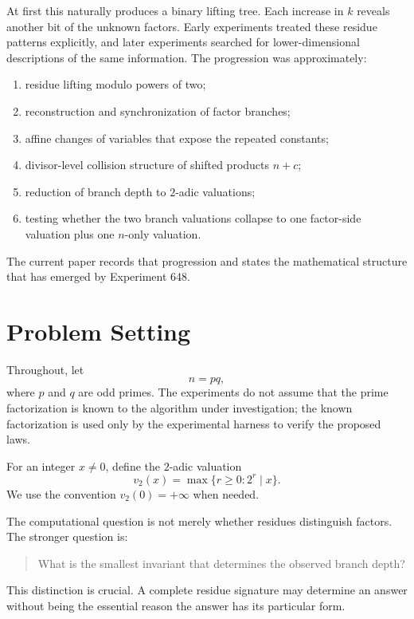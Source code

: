 \documentclass[11pt,a4paper]{article}
\newcommand{\vTwo}{v_2}
\begin{document}
At first this naturally produces a binary lifting tree. Each increase in $k$ reveals another bit of the unknown factors. Early experiments treated these residue patterns explicitly, and later experiments searched for lower-dimensional descriptions of the same information. The progression was approximately:

\begin{enumerate}[leftmargin=2em]
    \item residue lifting modulo powers of two;
    \item reconstruction and synchronization of factor branches;
    \item affine changes of variables that expose the repeated constants;
    \item divisor-level collision structure of shifted products $n+c$;
    \item reduction of branch depth to $2$-adic valuations;
    \item testing whether the two branch valuations collapse to one factor-side valuation plus one $n$-only valuation.
\end{enumerate}

The current paper records that progression and states the mathematical structure that has emerged by Experiment 648.

\section{Problem Setting}

Throughout, let
\[
    n=pq,
\]
where $p$ and $q$ are odd primes. The experiments do not assume that the prime factorization is known to the algorithm under investigation; the known factorization is used only by the experimental harness to verify the proposed laws.

For an integer $x\ne0$, define the $2$-adic valuation
\[
    \vTwo(x)=\max\{r\ge0:2^r\mid x\}.
\]
We use the convention $\vTwo(0)=+\infty$ when needed.

The computational question is not merely whether residues distinguish factors. The stronger question is:

\begin{quote}
What is the smallest invariant that determines the observed branch depth?
\end{quote}

This distinction is crucial. A complete residue signature may determine an answer without being the essential reason the answer has its particular form.
\end{document}
